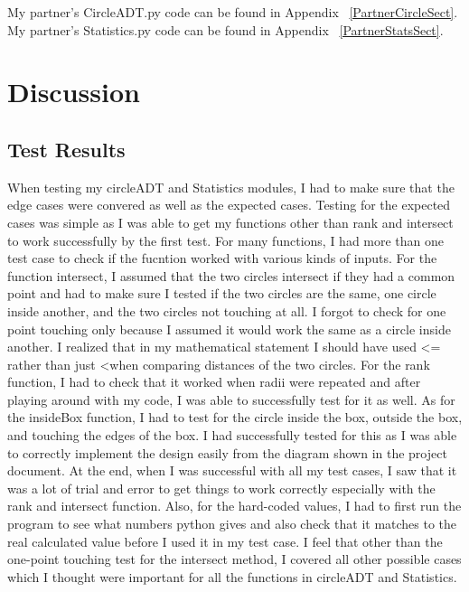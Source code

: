 \documentclass[12pt]{article}
\begin{document}
My partner's CircleADT.py code can be found in Appendix ~\ref{PartnerCircleSect}.\newline
My partner's Statistics.py code can be found in Appendix ~\ref{PartnerStatsSect}.

\section{Discussion}

\subsection{Test Results}

When testing my circleADT and Statistics modules, I had to make sure that the edge cases were convered as well as the expected cases. Testing for the expected cases was simple as I was able to get my functions other than rank and intersect to work successfully by the first test. For many functions, I had more than one test case to check if the fucntion worked with various kinds of inputs. For the function intersect, I assumed that the two circles intersect if they had a common point and had to make sure I tested if the two circles are the same, one circle inside another, and the two circles not touching at all. I forgot to check for one point touching only because I assumed it would work the same as a circle inside another. I realized that in my mathematical statement I should have used \textless= rather than just \textless when comparing distances of the two circles. For the rank function, I had to check that it worked when radii were repeated and after playing around with my code, I was able to successfully test for it as well. As for the insideBox function, I had to test for the circle inside the box, outside the box, and touching the edges of the box. I had successfully tested for this as I was able to correctly implement the design easily from the diagram shown in the project document. At the end, when I was successful with all my test cases, I saw that it was a lot of trial and error to get things to work correctly especially with the rank and intersect function. Also, for the hard-coded values, I had to first run the program to see what numbers python gives and also check that it matches to the real calculated value before I used it in my test case. I feel that other than the one-point touching test for the intersect method, I covered all other possible cases which I thought were important for all the functions in circleADT and Statistics.
\end{document}
